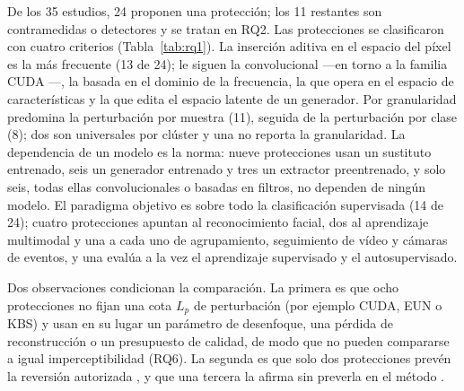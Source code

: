 \documentclass[pdflatex,sn-mathphys-num]{sn-jnl}
\theoremstyle{thmstyleone}
\theoremstyle{thmstyletwo}
\theoremstyle{thmstylethree}
\begin{document}
De los 35 estudios, 24 proponen una protección; los 11 restantes son contramedidas o detectores y se tratan en RQ2. Las protecciones se clasificaron con cuatro criterios (Tabla~\ref{tab:rq1}). La inserción aditiva en el espacio del píxel es la más frecuente (13 de 24); le siguen la convolucional ---en torno a la familia CUDA \cite{sadasivan2023cuda}---, la basada en el dominio de la frecuencia, la que opera en el espacio de características y la que edita el espacio latente de un generador. Por granularidad predomina la perturbación por muestra (11), seguida de la perturbación por clase (8); dos son universales por clúster y una no reporta la granularidad. La dependencia de un modelo es la norma: nueve protecciones usan un sustituto entrenado, seis un generador entrenado y tres un extractor preentrenado, y solo seis, todas ellas convolucionales o basadas en filtros, no dependen de ningún modelo. El paradigma objetivo es sobre todo la clasificación supervisada (14 de 24); cuatro protecciones apuntan al reconocimiento facial, dos al aprendizaje multimodal y una a cada uno de agrupamiento, seguimiento de vídeo y cámaras de eventos, y una evalúa a la vez el aprendizaje supervisado y el autosupervisado.

Dos observaciones condicionan la comparación. La primera es que ocho protecciones no fijan una cota $L_p$ de perturbación (por ejemplo CUDA, EUN o KBS) y usan en su lugar un parámetro de desenfoque, una pérdida de reconstrucción o un presupuesto de calidad, de modo que no pueden compararse a igual imperceptibilidad (RQ6). La segunda es que solo dos protecciones prevén la reversión autorizada \cite{wang2026reversible,chow2024chameleon}, y que una tercera la afirma sin preverla en el método \cite{wang2025event}.
\end{document}
